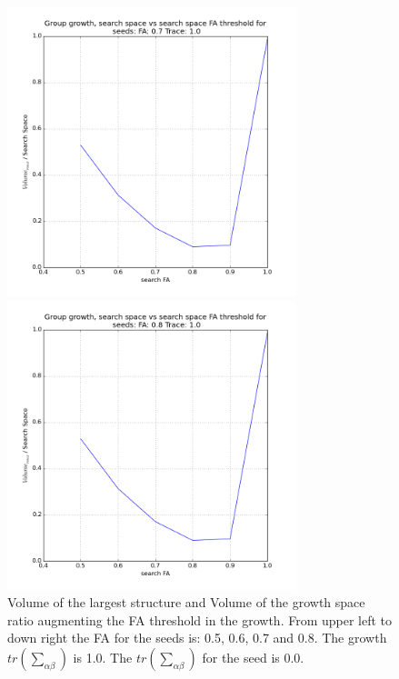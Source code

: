 \documentclass[12pt]{article}
\begin{document}
\begin{figure}[ht]
\begin{minipage}{.45\textwidth}
\end{minipage}
\begin{minipage}{.45\textwidth}
  \centering
  \includegraphics[width=0.75\textwidth]{groups/volumeplots/volumes_growth_FA07_Trace_10.png}
\end{minipage}
\begin{minipage}{.45\textwidth}
  \centering
  \includegraphics[width=0.75\textwidth]{groups/volumeplots/volumes_growth_FA08_Trace_10.png}
\end{minipage}
\caption{Volume of the largest structure and Volume of the growth space ratio augmenting the FA threshold in the growth. From upper left to down right the FA for the seeds is: 0.5, 0.6, 0.7 and 0.8. The growth $tr \left(\sum_{\alpha\beta}\right)$ is 1.0. The $tr \left(\sum_{\alpha\beta}\right)$ for the seed is 0.0.} \label{fg:vol_FA_growth}
\end{figure}
\FloatBarrier
\end{document}
